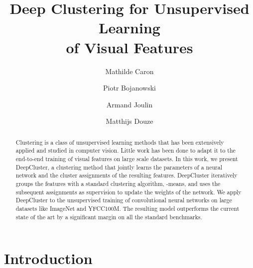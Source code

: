 \documentclass[runningheads]{llncs}
\makeatletter
\DeclareRobustCommand\onedot{\futurelet\@let@token\@onedot}
\def\@onedot{\ifx\@let@token.\else.\null\fi\xspace}
\def\etal{\emph{et al}\onedot}
\def\OURS{DeepCluster\xspace}
\makeatother
\begin{document}
\pagestyle{headings}
\mainmatter
\def\ECCV18SubNumber{1370}  


\title{Deep Clustering for Unsupervised Learning \\  of Visual Features} 


\authorrunning{Mathilde Caron \etal}

\author{Mathilde Caron \and Piotr Bojanowski \and Armand Joulin \and Matthijs Douze}


\maketitle

\begin{abstract}
  Clustering is a class of unsupervised learning methods that has been extensively applied and studied in computer vision.
  Little work has been done to adapt it to the end-to-end training of visual features on large scale datasets.
  In this work, we present \OURS, a clustering method that jointly learns the parameters of a neural network and the cluster assignments
  of the resulting features.
  \OURS iteratively groups the features with a standard clustering algorithm, -means, and uses the subsequent assignments as supervision
  to update the weights of the network.
  We apply \OURS to the unsupervised training of convolutional neural networks on large datasets like ImageNet and YFCC100M.
  The resulting model outperforms the current state of the art by a significant margin on all the standard benchmarks.
\end{abstract}

\section{Introduction}
\end{document}

